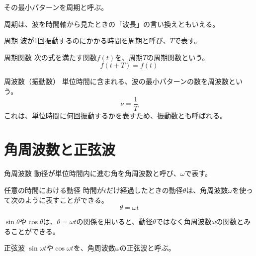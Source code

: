 \documentclass[../math-imaging]{subfiles}
\begin{document}
その最小パターンを周期と呼ぶ。

周期は、波を時間軸から見たときの「波長」の言い換えともいえる。

\begin{definition}{周期}
  波が1回振動するのにかかる時間を周期と呼び、$T$で表す。
\end{definition}

\begin{definition}{周期関数}
  次の式を満たす関数$f(t)$を、周期$T$の周期関数という。
  \LARGE
  \begin{equation}
    f(t+T) = f(t)
  \end{equation}
\end{definition}

\begin{definition}{周波数（振動数）}
  \newline
  単位時間に含まれる、波の最小パターンの数を周波数という。
  \LARGE
  \begin{equation}
    \nu = \dfrac{1}{T}
  \end{equation}
  \normalsize
  これは、単位時間に何回振動するかを表すため、振動数とも呼ばれる。
\end{definition}

\section{角周波数と正弦波}

\begin{definition}{角周波数}
  動径が単位時間内に進む角を角周波数と呼び、$\omega$で表す。
\end{definition}

\begin{theorem}{任意の時間における動径}
  \newline
  時間が$t$だけ経過したときの動径$\theta$は、角周波数$\omega$を使って次のように表すことができる。
  \LARGE
  \begin{equation}
    \theta = \omega t
  \end{equation}
\end{theorem}

$\sin\theta$や$\cos\theta$は、$\theta=\omega t$の関係を用いると、動径$\theta$ではなく角周波数$\omega$の関数とみることができる。

\begin{definition}{正弦波}
  $\sin\omega t$や$\cos\omega t$を、角周波数$\omega$の正弦波と呼ぶ。
\end{definition}
\end{document}
